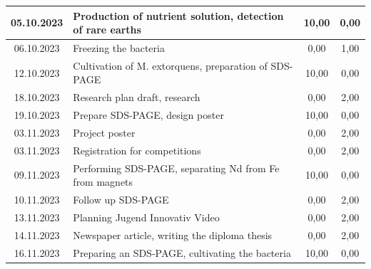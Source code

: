 \begin{longtable}{|c|p{7cm}|c|c|}
    05.10.2023    & Production of nutrient solution, detection of rare earths                                                       & 10,00                & 0,00              \\ \hline
    06.10.2023    & Freezing the bacteria                                                                                           & 0,00                 & 1,00              \\ \hline
    12.10.2023    & Cultivation of M. extorquens, preparation of SDS-PAGE                                                           & 10,00                & 0,00              \\ \hline
    18.10.2023    & Research plan draft, research                                                                                   & 0,00                 & 2,00              \\ \hline
    19.10.2023    & Prepare SDS-PAGE, design poster                                                                                 & 10,00                & 0,00              \\ \hline
    03.11.2023    & Project poster                                                                                                  & 0,00                 & 2,00              \\ \hline
    03.11.2023    & Registration for competitions                                                                                   & 0,00                 & 2,00              \\ \hline
    09.11.2023    & Performing SDS-PAGE, separating Nd from Fe from magnets                                                         & 10,00                & 0,00              \\ \hline
    10.11.2023    & Follow up SDS-PAGE                                                                                              & 0,00                 & 2,00              \\ \hline
    13.11.2023    & Planning Jugend Innovativ Video                                                                                 & 0,00                 & 2,00              \\ \hline
    14.11.2023    & Newspaper article, writing the diploma thesis                                                                   & 0,00                 & 2,00              \\ \hline
    16.11.2023    & Preparing an SDS-PAGE, cultivating the bacteria                                                                 & 10,00                & 0,00              \\ \hline

\end{longtable}
